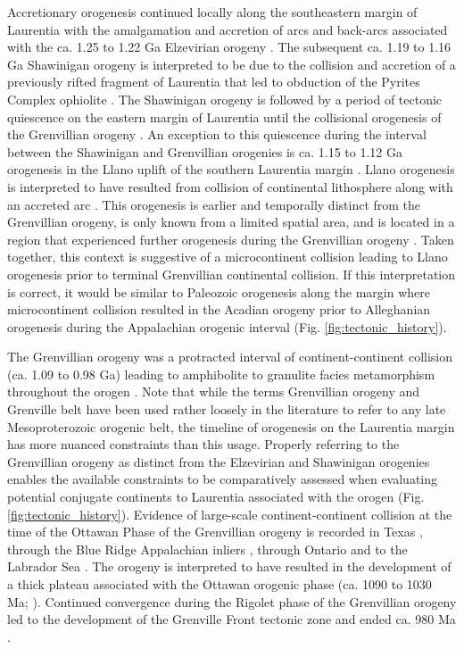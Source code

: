 \documentclass[twocolumn, switch]{article} %
\begin{document}
Accretionary orogenesis continued locally along the southeastern margin of Laurentia with the amalgamation and accretion of arcs and back-arcs associated with the ca. 1.25 to 1.22 Ga Elzevirian orogeny \citep{Carr2000a,McLelland2013a}. The subsequent ca. 1.19 to 1.16 Ga Shawinigan orogeny is interpreted to be due to the collision and accretion of a previously rifted fragment of Laurentia that led to obduction of the Pyrites Complex ophiolite \citep{Carr2000a,McLelland2010a, Chiarenzelli2011a}. The Shawinigan orogeny is followed by a period of tectonic quiescence on the eastern margin of Laurentia until the collisional orogenesis of the Grenvillian orogeny \citep{McLelland2010a}. An exception to this quiescence during the interval between the Shawinigan and Grenvillian orogenies is ca. 1.15 to 1.12 Ga orogenesis in the Llano uplift of the southern Laurentia margin \citep{Mosher1998a}. Llano orogenesis is interpreted to have resulted from collision of continental lithosphere along with an accreted arc \citep{Mosher1998a}. This orogenesis is earlier and temporally distinct from the Grenvillian orogeny, is only known from a limited spatial area, and is located in a region that experienced further orogenesis during the Grenvillian orogeny \citep{Grimes2004a}. Taken together, this context is suggestive of a microcontinent collision leading to Llano orogenesis prior to terminal Grenvillian continental collision. If this interpretation is correct, it would be similar to Paleozoic orogenesis along the margin where microcontinent collision resulted in the Acadian orogeny prior to Alleghanian orogenesis during the Appalachian orogenic interval (Fig. \ref{fig:tectonic_history}).

The Grenvillian orogeny was a protracted interval of continent-continent collision (ca. 1.09 to 0.98 Ga) leading to amphibolite to granulite facies metamorphism throughout the orogen \citep{Carr2000a, Rivers2008a, Rivers2012a, Indares2020a}. Note that while the terms Grenvillian orogeny and Grenville belt have been used rather loosely in the literature to refer to any late Mesoproterozoic orogenic belt, the timeline of orogenesis on the Laurentia margin has more nuanced constraints than this usage. Properly referring to the Grenvillian orogeny as distinct from the Elzevirian and Shawinigan orogenies enables the available constraints to be comparatively assessed when evaluating potential conjugate continents to Laurentia associated with the orogen (Fig. \ref{fig:tectonic_history}). Evidence of large-scale continent-continent collision at the time of the Ottawan Phase of the Grenvillian orogeny is recorded in Texas \citep{Grimes2004a}, through the Blue Ridge Appalachian inliers \citep{Johnson2020a}, through Ontario and to the Labrador Sea \citep{Rivers2008a, Rivers2012a}. The orogeny is interpreted to have resulted in the development of a thick plateau associated with the Ottawan orogenic phase (ca. 1090 to 1030 Ma; \citealp{Rivers2008a}). Continued convergence during the Rigolet phase of the Grenvillian orogeny led to the development of the Grenville Front tectonic zone and ended ca. 980 Ma \citep{Hynes2010a}.
\end{document}

